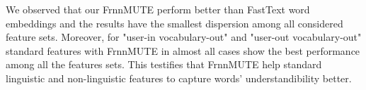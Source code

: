 We observed that our FrnnMUTE perform better than FastText word embeddings and the results have the smallest dispersion among all considered feature sets. Moreover,  for "user-in vocabulary-out" and "user-out vocabulary-out" standard features with FrnnMUTE in almost all cases show the best performance among all the features sets. This testifies that FrnnMUTE help standard linguistic and non-linguistic features to capture words' understandibility better.  